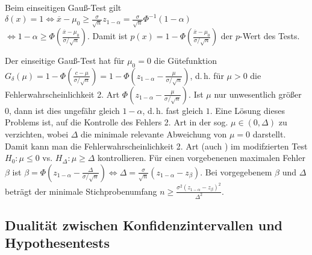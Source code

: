\begin{Bsp}
    Beim einseitigen Gauß-Test gilt
    $\delta(x) = 1 \iff \overline{x} - \mu_0 \ge \frac{\sigma}{\sqrt{n}} z_{1-\alpha}
    = \frac{\sigma}{\sqrt{n}} \Phi^{-1}(1-\alpha)$\\
    $\iff 1 - \alpha \ge \Phi\!\left(\frac{\overline{x} - \mu_0}{\sigma/\sqrt{n}}\right)$.
    Damit ist $p(x) = 1 - \Phi\!\left(\frac{\overline{x} - \mu_0}{\sigma/\sqrt{n}}\right)$
    der $p$-Wert des Tests.
\end{Bsp}

\linie

\begin{Bsp}
    Der einseitige Gauß-Test hat für $\mu_0 = 0$ die Gütefunktion\\
    $G_\delta(\mu)
    = 1 - \Phi\!\left(\frac{c - \mu}{\sigma/\sqrt{n}}\right)
    = 1 - \Phi\!\left(z_{1-\alpha} - \frac{\mu}{\sigma/\sqrt{n}}\right)$,
    d.\,h. für $\mu > 0$ die Fehlerwahrscheinlichkeit 2. Art
    $\Phi\!\left(z_{1-\alpha} - \frac{\mu}{\sigma/\sqrt{n}}\right)$.
    Ist $\mu$ nur unwesentlich größer $0$, dann ist dies ungefähr gleich
    $1 - \alpha$, d.\,h. fast gleich $1$.
    Eine Lösung dieses Problems ist, auf die Kontrolle des Fehlers 2. Art in der sog.
     $\mu \in (0, \Delta)$ zu verzichten,
    wobei $\Delta$ die minimale relevante Abweichung von $\mu = 0$ darstellt.
    Damit kann man die Fehlerwahrscheinlichkeit 2. Art (auch )
    im modifzierten Test
    $H_0\colon \mu \le 0$ vs. $H_\Delta\colon \mu \ge \Delta$ kontrollieren.
    Für einen vorgebenenen maximalen Fehler $\beta$ ist
    $\beta = \Phi\!\left(z_{1-\alpha} - \frac{\Delta}{\sigma/\sqrt{n}}\right)
    \iff \Delta = \frac{\sigma}{\sqrt{n}} (z_{1-\alpha} - z_\beta)$.
    Bei vorgegebenem $\beta$ und $\Delta$ beträgt der minimale Stichprobenumfang
    $n \ge \frac{\sigma^2(z_{1-\alpha} - z_\beta)^2}{\Delta^2}$.
\end{Bsp}

\subsection{%
    Dualität zwischen Konfidenzintervallen und Hypothesentests%
}

